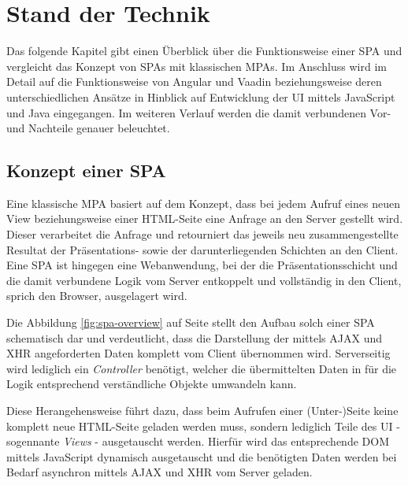 \documentclass[a4paper,12pt,twoside]{scrreprt}
\begin{document}
\chapter{Stand der Technik}
\label{chap:stand-technik}
Das folgende Kapitel gibt einen Überblick über die Funktionsweise einer \acl{SPA} und vergleicht das Konzept von \acsp{SPA} mit klassischen \aclp{MPA}. Im Anschluss wird im Detail auf die Funktionsweise von Angular und Vaadin beziehungsweise deren unterschiedlichen Ansätze in Hinblick auf Entwicklung der \acs{UI} mittels JavaScript und Java eingegangen. Im weiteren Verlauf werden die damit verbundenen Vor- und Nachteile genauer beleuchtet.

\section{Konzept einer \acl{SPA}}
\label{sec:konzept-spa}
Eine klassische \acl{MPA} basiert auf dem Konzept, dass bei jedem Aufruf eines neuen View beziehungsweise einer HTML-Seite eine Anfrage an den Server gestellt wird. Dieser verarbeitet die Anfrage und retourniert das jeweils neu zusammengestellte Resultat der Präsentations- sowie der darunterliegenden Schichten an den Client. Eine \acl{SPA} ist hingegen eine Webanwendung, bei der die Präsentationsschicht und die damit verbundene Logik vom Server entkoppelt und vollständig in den Client, sprich den Browser, ausgelagert wird. \parencite[][Seite 5ff.]{scott_spa_2015}

Die Abbildung \ref{fig:spa-overview} auf Seite \pageref{fig:spa-overview} stellt den Aufbau solch einer \acs{SPA} schematisch dar und verdeutlicht, dass die Darstellung der mittels \acs{AJAX} und XHR angeforderten Daten komplett vom Client übernommen wird. Serverseitig wird lediglich ein \textit{Controller} benötigt, welcher die übermittelten Daten in für die Logik entsprechend verständliche Objekte umwandeln kann.

\medskip

Diese Herangehensweise führt dazu, dass beim Aufrufen einer (Unter-)Seite keine komplett neue HTML-Seite geladen werden muss, sondern lediglich Teile des \acl{UI} - sogennante \textit{Views} - ausgetauscht werden. Hierfür wird das entsprechende \ac{DOM} mittels JavaScript dynamisch ausgetauscht und die benötigten Daten werden bei Bedarf asynchron mittels \acs{AJAX} und XHR vom Server geladen. \parencite[][Seite 7]{scott_spa_2015}
\end{document}
